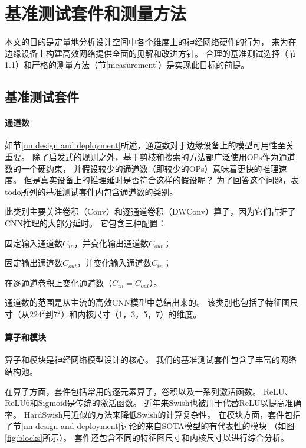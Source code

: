 \section{基准测试套件和测量方法}
\label{methodology}
本文的目的是定量地分析设计空间中各个维度上的神经网络硬件的行为，
来为在边缘设备上构建高效网络提供全面的见解和改进方针。
合理的基准测试选择（节\ref{suite}）和严格的测量方法（节\ref{measurement}）是实现此目标的前提。

\subsection{基准测试套件}
\label{suite}


\paragraph{通道数}
如节\ref{nn design and deployment}所述，通道数对于边缘设备上的模型可用性至关重要。
除了启发式的规则之外，基于剪枝和搜索的方法都广泛使用OPs作为通道数的一个硬约束，
并假设较少的通道数（即较少的OPs）意味着更快的推理速度。
但是真实设备上的推理延时是否符合这样的假设呢？
为了回答这个问题，表todo所列的基准测试套件内包含通道数的类别。

此类别主要关注卷积（Conv）和逐通道卷积（DWConv）算子，因为它们占据了CNN推理的大部分延时。
它包含三种配置：
\begin{enumerate*}[label=(\alph*)]
    \item 固定输入通道数$C_{in}$，并变化输出通道数$C_{out}$；
    \item 固定输出通道数$C_{out}$，并变化输入通道数$C_{in}$；
    \item 在逐通道卷积上变化通道数（$C_{in}=C_{out}$）。
\end{enumerate*}
通道数的范围是从主流的高效CNN模型中总结出来的。
该类别也包括了特征图尺寸（从$224^2$到$7^2$）和内核尺寸（1，3，5，7）的维度。

\paragraph{算子和模块}
算子和模块是神经网络模型设计的核心。
我们的基准测试套件包含了丰富的网络结构池。

在算子方面，套件包括常用的逐元素算子，卷积以及一系列激活函数。
ReLU、ReLU6和Sigmoid是传统的激活函数。
近年来Swish\cite{ramachandran2017swish}也被用于代替ReLU以提高准确率。
HardSwish用近似的方法来降低Swish的计算复杂性。
在模块方面，套件包括了节\ref{nn design and deployment}讨论的来自SOTA模型的有代表性的模块
（如图\ref{fig:blocks}所示）。
套件还包含不同的特征图尺寸和内核尺寸以进行综合分析。

